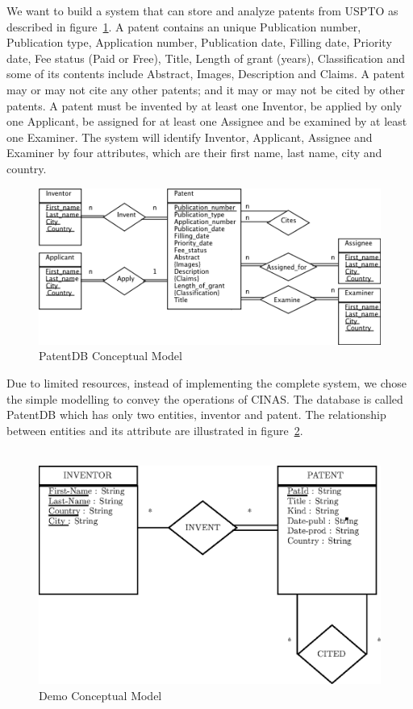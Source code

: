 \documentclass{article}
\begin{document}
We want to build a system that can store and analyze patents from USPTO as described in figure~\ref{fig:erd}. A patent contains an unique Publication number, Publication type, Application number, Publication date, Filling date, Priority date, Fee status (Paid or Free), Title, Length of grant (years), Classification and some of its contents include Abstract, Images, Description and Claims. A patent may or may not cite any other patents; and it may or may not be cited by other patents. A patent must be invented by at least one Inventor, be applied by only one Applicant, be assigned for at least one Assignee and be examined by at least one Examiner. The system will identify Inventor, Applicant, Assignee and Examiner by four attributes, which are their first name, last name, city and country.
\begin{figure}[h!]
\centering
\includegraphics[width=\textwidth]{erd.png}
\caption{ PatentDB Conceptual Model} \label{fig:erd}
\end{figure}\par
Due to limited resources, instead of implementing the complete system, we chose the simple modelling to convey the operations of CINAS. The database is called PatentDB which has only two entities, inventor and patent. The relationship between entities and its attribute are illustrated in figure~\ref{fig:conceptual}.\\~\\
\begin{figure}[h!]
\centering
\includegraphics[width=\textwidth]{conceptual_model.eps}
\caption{ Demo Conceptual Model} \label{fig:conceptual}
\end{figure}\par~\\
\end{document}
